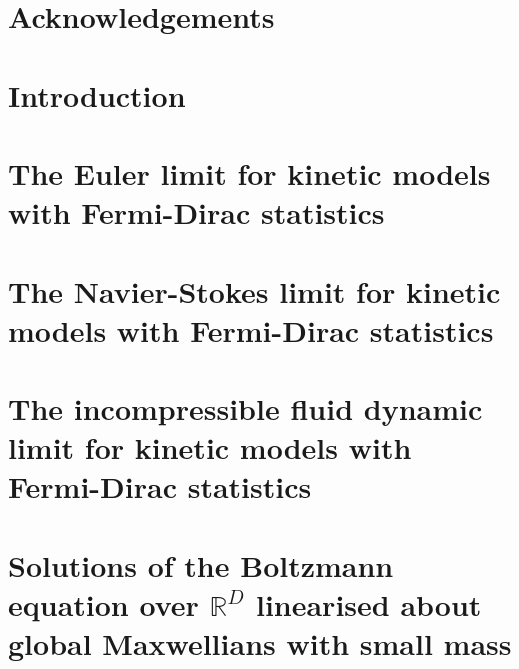 \documentclass[a4paper,12pt,twoside,%
]{memoir}
\begin{document}

\frontmatter

\newpage


\chapter*{Acknowledgements} %
\label{cha:acknowledgements}

\cleardoublepage
\tableofcontents*
\mainmatter


\chapter*{Introduction} %
\label{cha:intro}


\chapter[The Euler limit for kinetic models with Fermi-Dirac statistics][Euler limit]{The Euler limit for kinetic models with Fermi-Dirac statistics} %
\label{cha:i}


\chapter[The Navier-Stokes limit for kinetic models with Fermi-Dirac statistics][Navier-Stokes limit]{The Navier-Stokes limit for kinetic models with Fermi-Dirac statistics} %
\label{cha:ii}


\chapter[The incompressible fluid dynamic limit for kinetic models with Fermi-Dirac statistics][Incompressible fluid dynamic limit]{The incompressible fluid dynamic limit for kinetic models with Fermi-Dirac statistics} %
\label{cha:iii}

\chapter[Solutions of the Boltzmann equation over \texorpdfstring{$\mathbb R^D$}{RD}  linearised about global Maxwellians with small mass][Solutions near global Maxwellians]{Solutions of the Boltzmann equation over \texorpdfstring{$\mathbb R^D$}{RD} linearised about global Maxwellians with small mass} %
\label{cha:iv}


\printbibliography



% 
\end{document}

